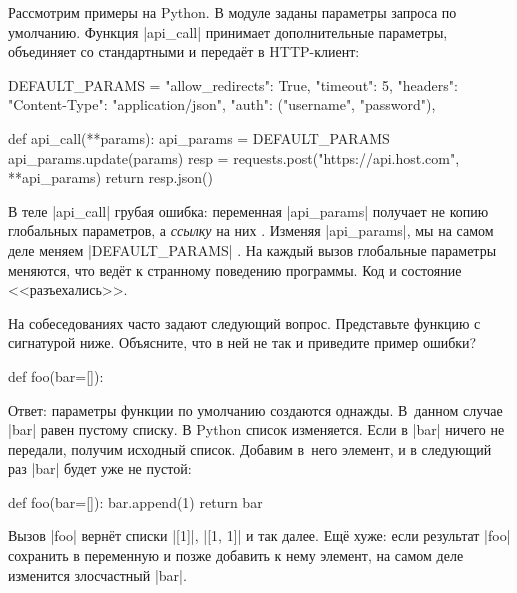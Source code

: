 
Рассмотрим примеры на Python. В модуле заданы параметры запроса по
умолчанию. Функция \spverb|api_call| принимает дополнительные параметры,
объединяет со стандартными и переда\"{е}т в HTTP-клиент:

\begin{english}
  \begin{python/lines}
DEFAULT_PARAMS = {
    "allow_redirects": True,
    "timeout": 5,
    "headers": {"Content-Type": "application/json"},
    "auth": ("username", "password"),
}

def api_call(**params):
    api_params = DEFAULT_PARAMS
    api_params.update(params)
    resp = requests.post("https://api.host.com", **api_params)
    return resp.json()
  \end{python/lines}
\end{english}


В теле \spverb|api_call| грубая ошибка: переменная \spverb|api_params| получает
не копию глобальных параметров, а \emph{ссылку} на них . Изменяя
\spverb|api_params|, мы на самом деле меняем \spverb|DEFAULT_PARAMS|
. На каждый вызов глобальные параметры меняются, что вед\"{е}т к
странному поведению программы. Код и состояние <<разъехались>>.


На собеседованиях часто задают следующий вопрос. Представьте функцию с
сигнатурой ниже. Объясните, что в ней не так и приведите пример ошибки?

\begin{english}
  \begin{python}
def foo(bar=[]):
  \end{python}
\end{english}

Ответ: параметры функции по умолчанию создаются однажды. В~данном случае
\spverb|bar| равен пустому списку. В Python список изменяется. Если в
\spverb|bar| ничего не передали, получим исходный список. Добавим в~него
элемент, и в следующий раз \spverb|bar| будет уже не пустой:

\begin{english}
  \begin{python}
def foo(bar=[]):
    bar.append(1)
    return bar
  \end{python}
\end{english}

Вызов \spverb|foo| верн\"{е}т списки \spverb|[1]|, \spverb|[1, 1]| и так
далее. Ещ\"{е} хуже: если результат \spverb|foo| сохранить в переменную и позже
добавить к нему элемент, на самом деле изменится злосчастный \spverb|bar|.

